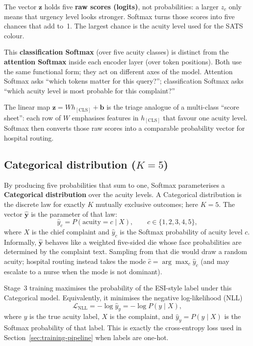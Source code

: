 \begin{remark}
The vector \(\mathbf{z}\) holds five \textbf{raw scores (logits)}, not probabilities: a larger \(z_c\) only means that urgency level looks stronger. Softmax turns those scores into five chances that add to~1. The largest chance is the acuity level used for the SATS colour.
\end{remark}

This \textbf{classification Softmax} (over five acuity classes) is distinct from the \textbf{attention Softmax} inside each encoder layer (over token positions). Both use the same functional form; they act on different axes of the model. Attention Softmax asks ``which tokens matter for this query?''; classification Softmax asks ``which acuity level is most probable for this complaint?''

\begin{remark}
The linear map \(\mathbf{z}=W h_{\mathrm{[CLS]}}+\mathbf{b}\) is the triage analogue of a multi-class ``score sheet'': each row of \(W\) emphasises features in \(h_{\mathrm{[CLS]}}\) that favour one acuity level. Softmax then converts those raw scores into a comparable probability vector for hospital routing.
\end{remark}

\subsection{Categorical distribution (\(K=5\))}

By producing five probabilities that sum to one, Softmax parameterises a \textbf{Categorical distribution} over the acuity levels. A Categorical distribution is the discrete law for exactly \(K\) mutually exclusive outcomes; here \(K=5\). The vector \(\hat{\mathbf{y}}\) is the parameter of that law:
\begin{equation}
  \hat{y}_c = P(\text{acuity}=c \mid X), \qquad c\in\{1,2,3,4,5\},
\end{equation}
where \(X\) is the chief complaint and \(\hat{y}_c\) is the Softmax probability of acuity level \(c\).
Informally, \(\hat{\mathbf{y}}\) behaves like a weighted five-sided die whose face probabilities are determined by the complaint text. Sampling from that die would draw a random acuity; hospital routing instead takes the mode \(\hat{c}=\arg\max_c\hat{y}_c\) (and may escalate to a nurse when the mode is not dominant).

Stage~3 training maximises the probability of the ESI-style label under this Categorical model. Equivalently, it minimises the negative log-likelihood (NLL)
\begin{equation}
  \mathcal{L}_{\mathrm{NLL}} = -\log \hat{y}_{y} = -\log P(y\mid X),
\end{equation}
where \(y\) is the true acuity label, \(X\) is the complaint, and \(\hat{y}_{y}=P(y\mid X)\) is the Softmax probability of that label. This is exactly the cross-entropy loss used in Section~\ref{sec:training-pipeline} when labels are one-hot.

